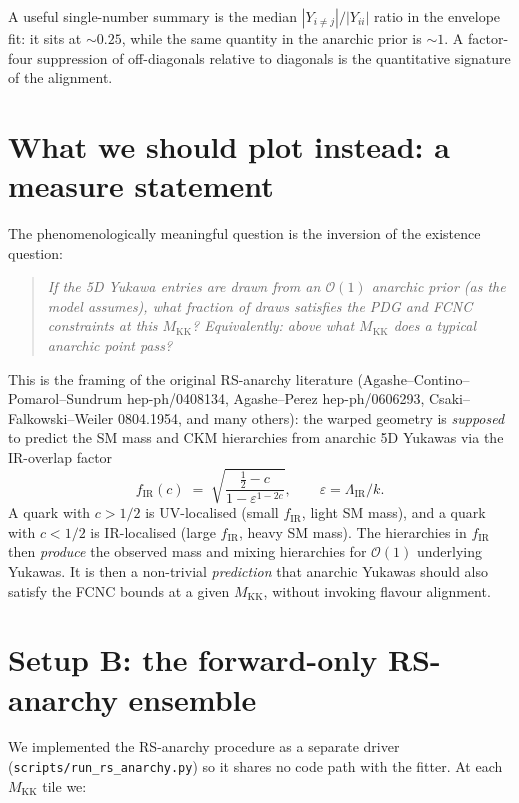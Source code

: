 \documentclass[11pt]{article}
\newcommand{\Mkk}{M_{\mathrm{KK}}}
\newcommand{\LamIR}{\Lambda_{\mathrm{IR}}}
\newcommand{\fIR}{f_{\mathrm{IR}}}
\begin{document}
A useful single-number summary is the median
$|Y_{i\neq j}| / |Y_{ii}|$ ratio in the envelope fit: it sits at
$\sim 0.25$, while the same quantity in the anarchic prior is $\sim 1$.
A factor-four suppression of off-diagonals relative to diagonals is the
quantitative signature of the alignment.

\section{What we should plot instead: a measure statement}
\label{sec:rs-anarchy}

The phenomenologically meaningful question is the inversion of the
existence question:
\begin{quote}\itshape
  If the 5D Yukawa entries are drawn from an $\mathcal{O}(1)$ anarchic
  prior (as the model assumes), what fraction of draws satisfies the PDG
  and FCNC constraints at this $\Mkk$? Equivalently: above what $\Mkk$
  does a typical anarchic point pass?
\end{quote}
This is the framing of the original RS-anarchy literature
(Agashe--Contino--Pomarol--Sundrum hep-ph/0408134, Agashe--Perez
hep-ph/0606293, Csaki--Falkowski--Weiler 0804.1954, and many others): the
warped geometry is \emph{supposed} to predict the SM mass and CKM
hierarchies from anarchic 5D Yukawas via the IR-overlap factor
\begin{equation}
  \fIR(c) \;=\; \sqrt{\frac{\tfrac{1}{2}-c}{1-\varepsilon^{1-2c}}},
  \qquad \varepsilon = \LamIR/k.
\end{equation}
A quark with $c > 1/2$ is UV-localised (small $\fIR$, light SM mass), and
a quark with $c < 1/2$ is IR-localised (large $\fIR$, heavy SM mass). The
hierarchies in $\fIR$ then \emph{produce} the observed mass and mixing
hierarchies for $\mathcal{O}(1)$ underlying Yukawas. It is then a
non-trivial \emph{prediction} that anarchic Yukawas should also satisfy
the FCNC bounds at a given $\Mkk$, without invoking flavour alignment.

\section{Setup B: the forward-only RS-anarchy ensemble}
\label{sec:setup-b}

We implemented the RS-anarchy procedure as a separate driver
(\texttt{scripts/run\_rs\_anarchy.py}) so it shares no code path with the
fitter. At each $\Mkk$ tile we:
\end{document}
